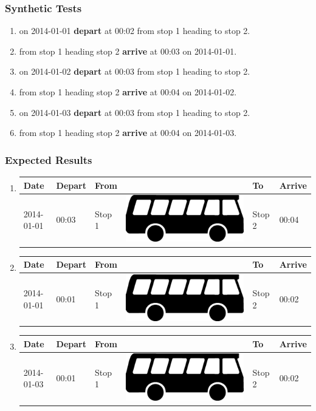 \documentclass[a4paper,11pt]{article}
\newcommand*{\bus}{\includegraphics[scale=0.02]{img/bus}}
\begin{document}
\begin{enumerate}
\begin{enumerate}
\subsubsection*{Synthetic Tests}
\begin{enumerate}
\item on 2014-01-01 \textbf{depart} at 00:02 from stop 1 heading to stop 2.
\item from stop 1 heading stop 2 \textbf{arrive} at 00:03 on 2014-01-01.

\item on 2014-01-02 \textbf{depart} at 00:03 from stop 1 heading to stop 2.
\item from stop 1 heading stop 2 \textbf{arrive} at 00:04 on 2014-01-02.

\item on 2014-01-03 \textbf{depart} at 00:03 from stop 1 heading to stop 2.
\item from stop 1 heading stop 2 \textbf{arrive} at 00:04 on 2014-01-03.
\end{enumerate}


\subsubsection*{Expected Results}
\begin{enumerate}
\item
{\scriptsize
\begin{tabular}{p{1.4cm} | p{.75cm} | p{2.1cm} c p{2.1cm} | p{.75cm} }
\hline
\rowcolor{Gray}
Date & Depart & From & & To & Arrive \\
\hline
2014-01-01 & 00:03 & Stop 1 & \bus & Stop 2 & 00:04 \\
\hline
\end{tabular}
}

\item
{\scriptsize
\begin{tabular}{p{1.4cm} | p{.75cm} | p{2.1cm} c p{2.1cm} | p{.75cm} }
\hline
\rowcolor{Gray}
Date & Depart & From & & To & Arrive \\
\hline
2014-01-01 & 00:01 & Stop 1 & \bus & Stop 2 & 00:02 \\
\hline
\end{tabular}
}

\item
{\scriptsize
\begin{tabular}{p{1.4cm} | p{.75cm} | p{2.1cm} c p{2.1cm} | p{.75cm} }
\hline
\rowcolor{Gray}
Date & Depart & From & & To & Arrive \\
\hline
2014-01-03 & 00:01 & Stop 1 & \bus & Stop 2 & 00:02 \\
\hline
\end{tabular}
}


\end{enumerate}
\end{enumerate}
\end{enumerate}
\end{document}
